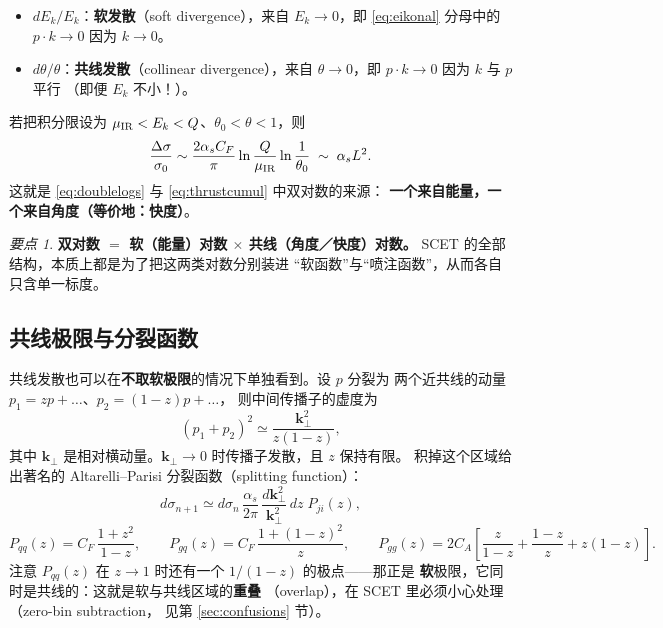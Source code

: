 \documentclass[UTF8,a4paper,11pt]{ctexart}
\theoremstyle{definition}
\theoremstyle{remark}
\newtheorem{keypoint}{要点}[section]
\theoremstyle{plain}
\newcommand{\kperp}{\bm{k}_\perp}
\newcommand{\as}{\alpha_s}
\newcommand{\CF}{C_F}
\newcommand{\CA}{C_A}
\newcommand{\en}[1]{\textsf{#1}}   %
\begin{document}
\begin{itemize}
  \item $dE_k/E_k$：\textbf{软发散}（\en{soft divergence}），来自
        $E_k\to0$，即 \eqref{eq:eikonal} 分母中的 $p\cdot k\to0$
        因为 $k\to0$。
  \item $d\theta/\theta$：\textbf{共线发散}（\en{collinear divergence}），来自
        $\theta\to0$，即 $p\cdot k\to0$ 因为 $k$ 与 $p$ 平行
        （即便 $E_k$ 不小！）。
\end{itemize}

若把积分限设为 $\mu_{\rm IR}<E_k<Q$、$\theta_0<\theta<1$，则
\begin{equation}
  \frac{\Delta\sigma}{\sigma_0}\sim
  \frac{2\as\CF}{\pi}\ln\frac{Q}{\mu_{\rm IR}}\ln\frac{1}{\theta_0}
  \;\sim\;\as L^2 .
\end{equation}
这就是 \eqref{eq:doublelogs} 与 \eqref{eq:thrustcumul} 中双对数的来源：
\textbf{一个来自能量，一个来自角度（等价地：快度）}。

\begin{keypoint}
\textbf{双对数 $=$ 软（能量）对数 $\times$ 共线（角度／快度）对数。}
SCET 的全部结构，本质上都是为了把这两类对数分别装进
“软函数”与“喷注函数”，从而各自只含单一标度。
\end{keypoint}

\subsection{共线极限与分裂函数}
\label{subsec:collinear}

共线发散也可以在\textbf{不取软极限}的情况下单独看到。设 $p$ 分裂为
两个近共线的动量 $p_1=z p+\dots$、$p_2=(1-z)p+\dots$，
则中间传播子的虚度为
\begin{equation}
  (p_1+p_2)^2 \simeq \frac{\kperp^2}{z(1-z)} ,
  \label{eq:splitvirt}
\end{equation}
其中 $\kperp$ 是相对横动量。$\kperp\to0$ 时传播子发散，且 $z$ 保持有限。
积掉这个区域给出著名的 Altarelli--Parisi 分裂函数（\en{splitting function}）：
\begin{equation}
  d\sigma_{n+1}\simeq d\sigma_n\,\frac{\as}{2\pi}\,
  \frac{d\kperp^2}{\kperp^2}\,dz\;P_{ji}(z),
\end{equation}
\begin{equation}
  P_{qq}(z)=\CF\,\frac{1+z^2}{1-z},\qquad
  P_{gq}(z)=\CF\,\frac{1+(1-z)^2}{z},\qquad
  P_{gg}(z)=2\CA\!\left[\frac{z}{1-z}+\frac{1-z}{z}+z(1-z)\right].
\end{equation}
注意 $P_{qq}(z)$ 在 $z\to1$ 时还有一个 $1/(1-z)$ 的极点——那正是
\textbf{软}极限，它同时是共线的：这就是软与共线区域的\textbf{重叠}
（\en{overlap}），在 SCET 里必须小心处理（\en{zero-bin subtraction}，
见第 \ref{sec:confusions} 节）。
\end{document}
